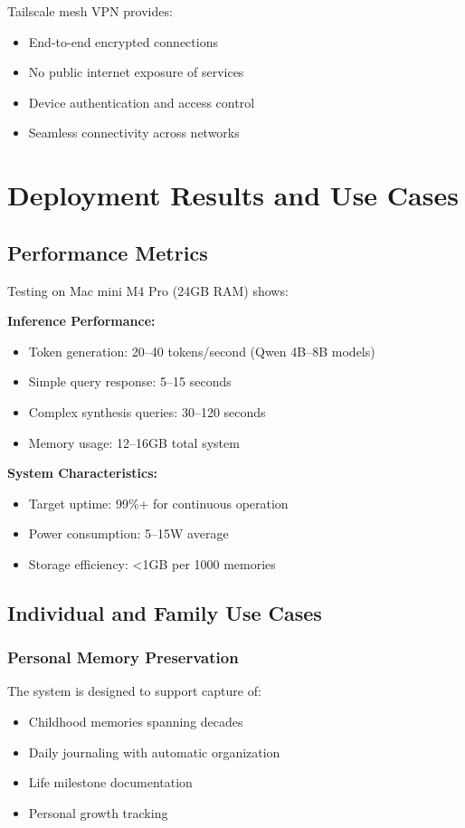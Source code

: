 \documentclass[11pt,letterpaper]{article}
\begin{document}
Tailscale mesh VPN provides:
\begin{itemize}
\item End-to-end encrypted connections
\item No public internet exposure of services
\item Device authentication and access control
\item Seamless connectivity across networks
\end{itemize}

\section{Deployment Results and Use Cases}

\subsection{Performance Metrics}

Testing on Mac mini M4 Pro (24GB RAM) shows:

\textbf{Inference Performance:}
\begin{itemize}
\item Token generation: 20--40 tokens/second (Qwen 4B--8B models)
\item Simple query response: 5--15 seconds
\item Complex synthesis queries: 30--120 seconds
\item Memory usage: 12--16GB total system
\end{itemize}

\textbf{System Characteristics:}
\begin{itemize}
\item Target uptime: 99\%+ for continuous operation
\item Power consumption: 5--15W average
\item Storage efficiency: <1GB per 1000 memories
\end{itemize}

\subsection{Individual and Family Use Cases}

\subsubsection{Personal Memory Preservation}

The system is designed to support capture of:
\begin{itemize}
\item Childhood memories spanning decades
\item Daily journaling with automatic organization
\item Life milestone documentation
\item Personal growth tracking
\end{itemize}
\end{document}
